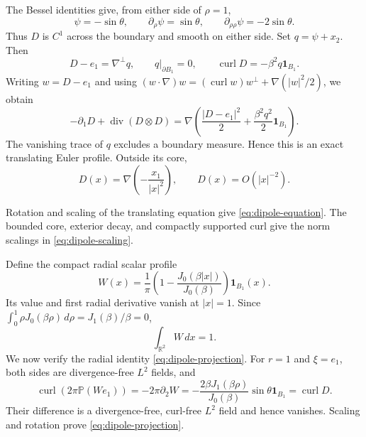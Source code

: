 \documentclass[11pt,a4paper,reqno]{amsart}
\theoremstyle{plain}
\theoremstyle{definition}
\theoremstyle{remark}
\numberwithin{equation}{section}
\newcommand{\R}{\mathbb R}
\newcommand{\PP}{\mathbb P}
\newcommand{\curl}{\operatorname{curl}}
\newcommand{\Div}{\operatorname{div}}
\newcommand{\dd}{\,dx}
\newcommand{\ind}{\mathbf 1}
\begin{document}
The Bessel identities give, from either side of $\rho=1$,
\[
 \psi=-\sin\theta,\qquad
 \partial_\rho\psi=\sin\theta,\qquad
 \partial_{\rho\rho}\psi=-2\sin\theta.
\]
Thus $D$ is $C^1$ across the boundary and smooth on either side. Set
$q=\psi+x_2$. Then
\[
 D-e_1=\nabla^\perp q,\qquad
 q|_{\partial B_1}=0,\qquad
 \curl D=-\beta^2q\ind_{B_1}.
\]
Writing $w=D-e_1$ and using
$(w\cdot\nabla)w=(\curl w)w^\perp+\nabla(|w|^2/2)$, we obtain
\[
 -\partial_1D+\Div(D\otimes D)
 =\nabla\left(\frac{|D-e_1|^2}{2}
              +\frac{\beta^2q^2}{2}\ind_{B_1}\right).
\]
The vanishing trace of $q$ excludes a boundary measure. Hence this
is an exact translating Euler profile. Outside its core,
\[
 D(x)=\nabla\left(-\frac{x_1}{|x|^2}\right),
 \qquad D(x)=O(|x|^{-2}).
\]

Rotation and scaling of the translating equation give
\eqref{eq:dipole-equation}. The bounded core, exterior decay,
and compactly supported curl give the norm scalings in
\eqref{eq:dipole-scaling}.

Define the compact radial scalar profile
\begin{equation}\label{eq:radial-density}
 W(x)=\frac1\pi\left(1-\frac{J_0(\beta|x|)}{J_0(\beta)}\right)
                          \ind_{B_1}(x).
\end{equation}
Its value and first radial derivative vanish at $|x|=1$.
Since $\int_0^1\rho J_0(\beta\rho)\,d\rho=J_1(\beta)/\beta=0$,
\[
 \int_{\R^2}W\dd=1.
\]
We now verify the radial identity \eqref{eq:dipole-projection}.
For $r=1$ and $\xi=e_1$, both sides are divergence-free $L^2$ fields,
and
\[
 \curl(2\pi\PP(We_1))=-2\pi\partial_2W
       =-\frac{2\beta J_1(\beta\rho)}{J_0(\beta)}\sin\theta
                         \ind_{B_1}=\curl D.
\]
Their difference is a divergence-free, curl-free $L^2$ field and hence
vanishes. Scaling and rotation prove \eqref{eq:dipole-projection}.
\end{document}
